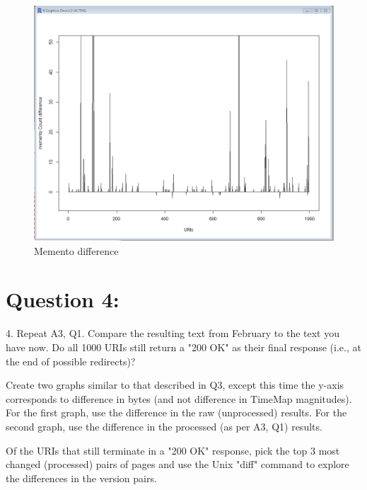 \documentclass[12pt]{article}
\begin{document}
 
\begin{figure}[ht]
\includegraphics[scale=0.4]{../../q3/output.png}
\centering
\caption{Memento difference}
\label{fig:Initial graph}
\end{figure}
\newpage


\section{Question 4: }
4.  Repeat A3, Q1.  Compare the resulting text from February to 
the text you have now.  Do all 1000 URIs still return a "200 OK" 
as their final response (i.e., at the end of possible redirects)?

Create two graphs similar to that described in Q3, except this 
time the y-axis corresponds to difference in bytes (and not difference
in TimeMap magnitudes).  For the first graph, use the difference
in the raw (unprocessed) results.  For the second graph, use the 
difference in the processed (as per A3, Q1) results.

Of the URIs that still terminate in a "200 OK" response, pick the
top 3 most changed (processed) pairs of pages and use the Unix
"diff" command to explore the differences in the version pairs.
\end{document}
